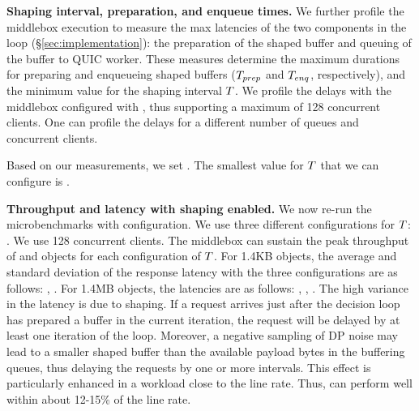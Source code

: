 \textbf{Shaping interval, preparation, and enqueue times.}
We further profile the middlebox execution to measure the max latencies of
the two components in the {\prepare} loop (\S\ref{sec:implementation}): the
preparation of the shaped buffer and queuing of the buffer to QUIC worker.
These measures determine the maximum
durations for preparing and
enqueueing shaped buffers ($T_{prep}$ and $T_{enq}$,
respectively), and the minimum value for the shaping interval
$T$. We profile the delays with the middlebox configured
with , thus supporting a maximum of 128 concurrent clients.
One can profile the delays for a different
number of queues and concurrent clients.

Based on our measurements, we set . The smallest
value for $T$ that we can configure is .

\textbf{Throughput and latency with shaping enabled.}
We now re-run the microbenchmarks with {\ns} configuration. We use three
different configurations for $T$: .
We use 128 concurrent clients. The middlebox can sustain the peak throughput of
 and  objects
for each configuration of $T$. For 1.4KB objects, the average and standard
deviation of the response latency with the three configurations are as follows:
, .
For 1.4MB objects, the latencies are as follows:
, , .
The high variance in the latency is due to shaping.
If a request arrives just after the decision loop has prepared a buffer in the
current iteration, the request will be delayed by at least one iteration of the
loop.
Moreover, a negative sampling of DP noise may lead to a smaller shaped buffer
than the available payload bytes in the buffering queues, thus delaying the
requests by one or more intervals. This effect is particularly enhanced in a
workload close to the line rate. Thus, {\sys} can perform well within about 12-15\%
of the line rate.

